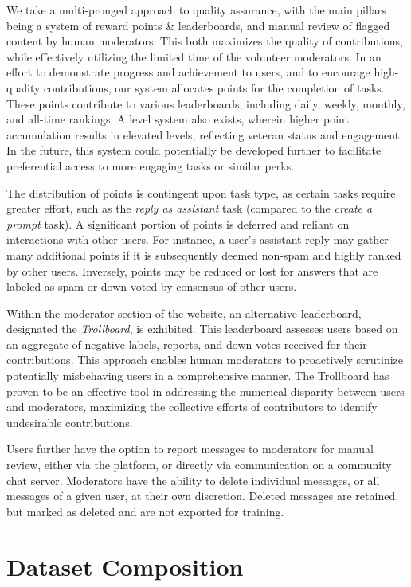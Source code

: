 We take a multi-pronged approach to quality assurance, with the main pillars being a system of reward points \& leaderboards, and manual review of flagged content by human moderators. This both maximizes the quality of contributions, while effectively utilizing the limited time of the volunteer moderators. In an effort to demonstrate progress and achievement to users, and to encourage high-quality contributions, our system allocates points for the completion of tasks. These points contribute to various leaderboards, including daily, weekly, monthly, and all-time rankings. A level system also exists, wherein higher point accumulation results in elevated levels, reflecting veteran status and engagement. In the future, this system could potentially be developed further to facilitate preferential access to more engaging tasks or similar perks.

The distribution of points is contingent upon task type, as certain tasks require greater effort, such as the \emph{reply as assistant} task (compared to the \emph{create a prompt} task). A significant portion of points is deferred and reliant on interactions with other users. For instance, a user's assistant reply may gather many additional points if it is subsequently deemed non-spam and highly ranked by other users. Inversely, points may be reduced or lost for answers that are labeled as spam or down-voted by consensus of other users.

Within the moderator section of the website, an alternative leaderboard, designated the \emph{Trollboard}, is exhibited. This leaderboard assesses users based on an aggregate of negative labels, reports, and down-votes received for their contributions. This approach enables human moderators to proactively scrutinize potentially misbehaving users in a comprehensive manner. The Trollboard has proven to be an effective tool in addressing the numerical disparity between users and moderators, maximizing the collective efforts of contributors to identify undesirable contributions.

Users further have the option to report messages to moderators for manual review, either via the platform, or directly via communication on a community chat server. Moderators have the ability to delete individual messages, or all messages of a given user, at their own discretion. Deleted messages are retained, but marked as deleted and are not exported for training.

\section{Dataset Composition}

